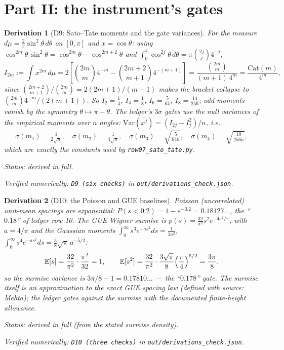 \documentclass[11pt]{article}
\newtheorem{deriv}{Derivation}
\theoremstyle{remark}
\newcommand{\bucket}[1]{\par\smallskip\noindent\textit{Status: #1.}}
\newcommand{\chk}[1]{\par\noindent\textit{Verified numerically:
\texttt{#1} in \texttt{out/derivations\_check.json}.}}
\begin{document}
\section{Part II: the instrument's gates}

\begin{deriv}[D9: Sato--Tate moments and the gate variances]\label{d9}
For the measure $d\mu = \frac{2}{\pi}\sin^2\theta\,d\theta$ on
$[0, \pi]$ and $x = \cos\theta$: using
$\cos^{2m}\theta\,\sin^2\theta = \cos^{2m}\theta - \cos^{2m+2}\theta$
and $\int_0^\pi \cos^{2j}\theta\,d\theta = \pi\binom{2j}{j}4^{-j}$,
\[
I_{2m} := \int x^{2m}\,d\mu
= 2\left[\binom{2m}{m}4^{-m} - \binom{2m+2}{m+1}4^{-(m+1)}\right]
= \frac{\binom{2m}{m}}{(m+1)\,4^m}
= \frac{\mathrm{Cat}(m)}{4^m},
\]
since $\binom{2m+2}{m+1}/\binom{2m}{m} = 2(2m+1)/(m+1)$ makes the
bracket collapse to $\binom{2m}{m}4^{-m}/(2(m+1))$. So
$I_2 = \tfrac14$, $I_4 = \tfrac18$, $I_6 = \tfrac{5}{64}$,
$I_8 = \tfrac{14}{256}$; odd moments vanish by the symmetry
$\theta \mapsto \pi - \theta$. The ledger's $3\sigma$ gates use the
null variances of the empirical moments over $n$ angles:
$\mathrm{Var}(\overline{x^j}) = (I_{2j} - I_j^2)/n$, i.e.
\[
\sigma(m_1) = \tfrac{1}{2\sqrt n},\quad
\sigma(m_2) = \tfrac{1}{4\sqrt n},\quad
\sigma(m_3) = \sqrt{\tfrac{5}{64 n}},\quad
\sigma(m_4) = \sqrt{\tfrac{10}{256 n}},
\]
which are exactly the constants used by
\texttt{row07\_sato\_tate.py}.
\bucket{derived in full}\chk{D9 (six checks)}
\end{deriv}

\begin{deriv}[D10: the Poisson and GUE baselines]\label{d10}
Poisson (uncorrelated) unit-mean spacings are exponential:
$P(s < 0.2) = 1 - e^{-0.2} = 0.18127\ldots$, the ``$0.18$'' of ledger
row 10. The GUE Wigner surmise is
$p(s) = \frac{32}{\pi^2}s^2 e^{-4s^2/\pi}$; with $a = 4/\pi$ and the
Gaussian moments $\int_0^\infty s^3 e^{-as^2} ds = \frac{1}{2a^2}$,
$\int_0^\infty s^4 e^{-as^2} ds = \frac{3}{8}\sqrt{\pi}\,a^{-5/2}$:
\[
\mathbb{E}[s] = \frac{32}{\pi^2}\cdot\frac{\pi^2}{32} = 1,
\qquad
\mathbb{E}[s^2] = \frac{32}{\pi^2}\cdot\frac{3\sqrt{\pi}}{8}
\Bigl(\frac{\pi}{4}\Bigr)^{5/2} = \frac{3\pi}{8},
\]
so the surmise variance is $3\pi/8 - 1 = 0.17810\ldots$ --- the
``$0.178$'' gate. The surmise itself is an approximation to the exact
GUE spacing law (defined with source: Mehta); the ledger gates against
the surmise with the documented finite-height allowance.
\bucket{derived in full (from the stated surmise density)}
\chk{D10 (three checks)}
\end{deriv}
\end{document}
